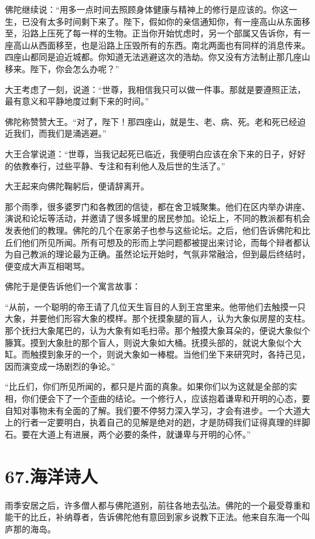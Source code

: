 \documentclass[12pt,twoside,openany]{book}
\begin{document}
佛陀继续说：“用多一点时间去照顾身体健康与精神上的修行是应该的。你这一生，已没有太多时间剩下来了。陛下，假如你的亲信通知你，有一座高山从东面移至，沿路上压死了每一样的生物。正当你开始忧虑时，另一个部属又告诉你，有一座高山从西面移至，也是沿路上压毁所有的东西。南北两面也有同样的消息传来。四座山都同是迫近城都。你知道无法逃避这次的浩劫。你又没有方法制止那几座山移来。陛下，你会怎么办呢？”

大王考虑了一刻，说道：“世尊，我相信我只可以做一件事。那就是要遵照正法，最有意义和平静地度过剩下来的时间。”

佛陀称赞赞大王。“对了，陛下！那四座山，就是生、老、病、死。老和死已经迫近我们，而我们是涌逃避。”

大王合掌说道：“世尊，当我记起死已临近，我便明白应该在余下来的日子，好好的依教奉行，过些平静、专注和有利他人及后世的生活了。”

大王起来向佛陀鞠躬后，便请辞离开。

那个雨季，很多婆罗门和各教团的信徒，都在舍卫城聚集。他们在区内举办讲座、演说和论坛等活动，并邀请了很多城里的居民参加。论坛上，不同的教派都有机会发表他们的教理。佛陀的几个在家弟子也参与这些论坛。之后，他们告诉佛陀和比丘们他们所见所闻。所有可想及的形而上学问题都被提出来讨论，而每个辩者都认为自己教派的理论最为正确。虽然论坛开始时，气氛非常融洽，但到最后终结时，便变成大声互相喝骂。

佛陀于是便告诉他们一个寓言故事：

“从前，一个聪明的帝王请了几位天生盲目的人到王宫里来。他带他们去触摸一只大象，并要他们形容大象的模样。那个抚摸象腿的盲人，认为大象似房屋的支柱。那个抚扫大象尾巴的，认为大象有如毛扫帚。那个触摸大象耳朵的，便说大象似个籐箕。摸到大象肚的那个盲人，则说大象如大桶。抚摸头部的，就说大象似个大缸。而触摸到象牙的一个，则说大象如一棒棍。当他们坐下来研究时，各持己见，因而演变成一场剧烈的争论。”

“比丘们，你们所见所闻的，都只是片面的真象。如果你们以为这就是全部的实相，你们便会下了一个歪曲的结论。一个修行人，应该抱着谦卑和开明的心态，要自知对事物未有全面的了解。我们要不停努力深入学习，才会有进步。一个大道大上的行者一定要明白，执着自己的见解是绝对的趔，才是防碍我们证得真理的绊脚石。要在大道上有进展，两个必要的条件，就谦卑与开明的心怀。”


\chapter{67.海洋诗人}\label{ch67}

雨季安居之后，许多僧人都与佛陀道别，前往各地去弘法。佛陀的一个最受尊重和能干的比丘，补纳尊者，告诉佛陀他有意回到家乡说教下正法。他来自东海一个叫庐那的海岛。
\end{document}
